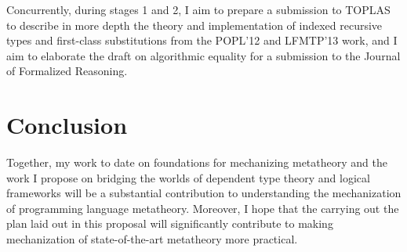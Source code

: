 \documentclass{article}
\begin{document}
Concurrently, during stages 1 and 2, I aim to prepare a submission to TOPLAS  to
describe in more depth the theory and implementation of indexed
recursive types and first-class substitutions from 
the POPL'12 and LFMTP'13 work, and I aim to elaborate the draft on algorithmic
equality for a submission to the Journal of Formalized Reasoning.

\section{Conclusion}
Together, my work to date on foundations for mechanizing metatheory
and the work I propose on bridging the worlds of dependent type theory
and logical frameworks will be a substantial contribution to
understanding the mechanization of programming language
metatheory. Moreover, I hope that the carrying out the plan laid out in
this proposal will significantly contribute to making mechanization of
state-of-the-art metatheory more practical. 



\end{document}
